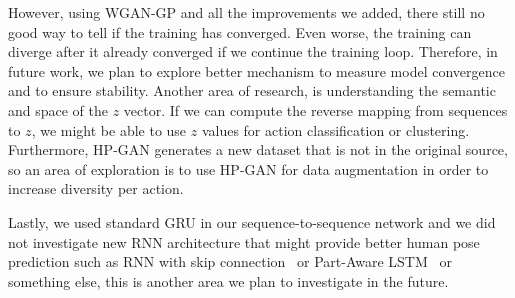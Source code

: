 \documentclass[10pt,twocolumn,letterpaper]{article}
\begin{document}
However, using WGAN-GP and all the improvements we added, there still no good way to tell if the training has converged. Even worse, the training can diverge after it already converged if we continue the training loop. Therefore, in future work, we plan to explore better mechanism to measure model convergence and to ensure stability. Another area of research, is understanding the semantic and space of the $z$ vector. If we can compute the reverse mapping from sequences to $z$, we might be able to use $z$ values for action classification or clustering. Furthermore, HP-GAN generates a new dataset that is not in the original source, so an area of exploration is to use HP-GAN for data augmentation in order to increase diversity per action. 

Lastly, we used standard GRU in our sequence-to-sequence network and we did not investigate new RNN architecture that might provide better human pose prediction such as RNN with skip connection~\cite{cvpr2017:julieta} or Part-Aware LSTM~\cite{cvpr2016:Shahroudy} or something else, this is another area we plan to investigate in the future.

\clearpage

{\small


}
\end{document}
